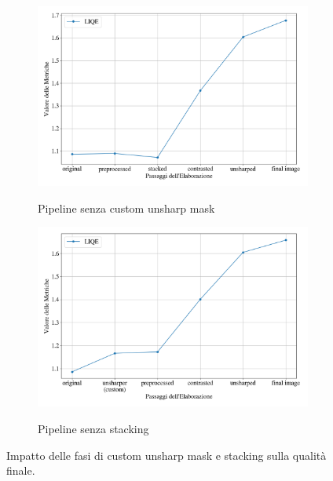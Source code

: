 \begin{figure}[H]
    \begin{subfigure}[t]{0.49\textwidth}
        \centering
        \caption{Pipeline senza custom unsharp mask}
        \includegraphics[width=\linewidth]{../assets/overall_no_ush.png}
        \label{fig:overall_no_ush_niqe}
    \end{subfigure}
    \hfill
    \begin{subfigure}[t]{0.49\textwidth}
        \centering
        \caption{Pipeline senza stacking}
        \includegraphics[width=\linewidth]{../assets/overall_no_stack.png}
        \label{fig:overall_no_ush_brisque}
    \end{subfigure}
    \caption{Impatto delle fasi di custom unsharp mask e stacking sulla qualità finale.}
\end{figure}

\cleardoublepage